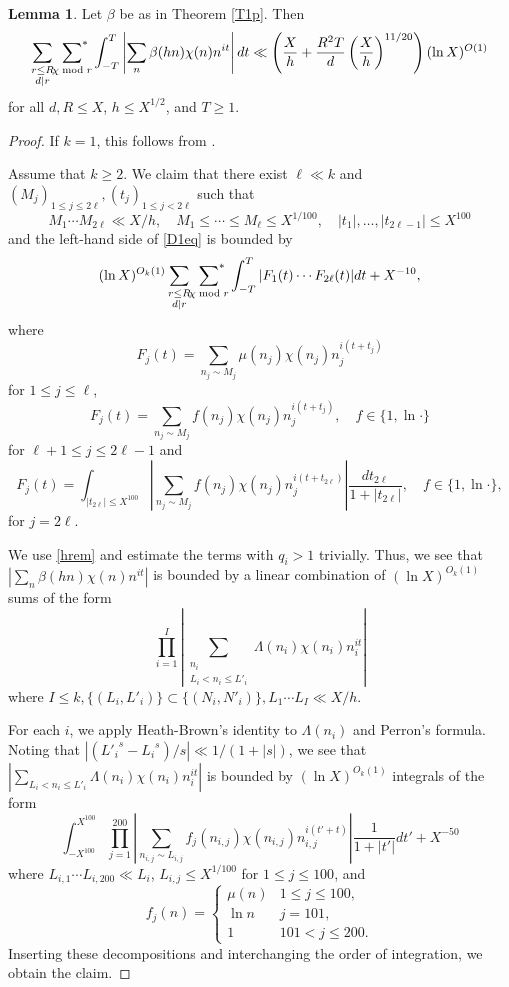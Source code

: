 \documentclass{amsart}
\theoremstyle{definition}
\newtheorem{lem}[dfn]{Lemma}
\theoremstyle{remark}
\newcommand{\1}{
    \bm{1}
}
\begin{document}
\begin{lem}\label{D1}
Let $\beta$ be as in Theorem \ref{T1p}. Then
\begin{equation} \label{D1eq} \sum_{\substack{r \leq R \\ d|r}} \sideset{}{^*}\sum_{\chi \bmod r} \int_{-T}^{T} \left| \sum_{n} \beta(hn) \chi(n) n^{it} \right| dt \ll \left(\frac{X}{h} + \frac{R^2T}{d}\left( \frac{X}{h} \right)^{11/20}\right) (\ln{X})^{O(1)} \end{equation}
for all $d,R \leq X$, $h \leq X^{1/2}$, and $T \geq 1$. 
\end{lem}

\begin{proof}
If $k=1$, this follows from \cite[Theorem 1.1]{choi2006mean}. 

Assume that $k \geq 2$. We claim that there exist $\ell \ll k$ and $(M_j)_{1 \leq j \leq 2\ell}, (t_j)_{1 \leq j < 2\ell}$ such that
\[ M_1 \cdots M_{2\ell} \ll X/h, \quad M_1 \leq \cdots \leq M_{\ell} \leq X^{1/100}, \quad |t_1|,\ldots,|t_{2\ell-1}| \leq X^{100} \]
and the left-hand side of \eqref{D1eq} is bounded by
\begin{equation} \label{D1F} (\ln{X})^{O_k(1)} \sum_{\substack{r \leq R \\ d|r}} \sideset{}{^*}\sum_{\chi \bmod r} \int_{-T}^{T} |F_1(t) \cdots F_{2\ell}(t)| dt + X^{-10}, \end{equation}
where
\[ F_j(t) = \sum_{n_j \sim M_j} \mu(n_j) \chi(n_j) n_j^{i(t+t_j)} \]
for $1 \leq j \leq \ell$, 
\[ F_j(t) = \sum_{n_j \sim M_j} f(n_j) \chi(n_j) n_j^{i(t+t_j)}, \quad f \in \{1,\ln{\cdot}\} \]
for $\ell+1 \leq j \leq 2\ell-1$ and
\[ F_j(t) = \int_{|t_{2\ell}| \leq X^{100}} \left| \sum_{n_j \sim M_j} f(n_{j}) \chi(n_j) n_j^{i(t+t_{2\ell})} \right| \frac{dt_{2\ell}}{1+|t_{2\ell}|}, \quad f \in \{1,\ln{\cdot}\}, \]
for $j=2\ell$. 


We use \eqref{hrem} and estimate the terms with \(q_i>1\) trivially. Thus, we see that $\left| \sum_{n} \beta(hn) \chi(n) n^{it} \right|$ is bounded by a linear combination of $(\ln{X})^{O_k(1)}$ sums of the form
\[ \prod_{i=1}^{I} \left| \sum_{\substack{n_i \\ L_i < n_i \leq L'_i}} \Lambda(n_i) \chi(n_i) n^{it}_i \right| \]
where $I \leq k, \{(L_i,L'_i)\} \subset \{(N_i,N'_i)\}, L_1 \cdots L_I \ll X/h$. 


For each $i$, we apply Heath-Brown's identity to $\Lambda(n_i)$ and Perron's formula. 
Noting that $\left| ({L'_i}^{s}-{L_i}^{s})/s \right| \ll 1/(1+|s|)$, we see that $\left| \sum_{L_i < n_i \leq L'_i} \Lambda(n_i) \chi(n_i) n^{it}_i \right|$ is bounded by $(\ln{X})^{O_k(1)}$ integrals of the form 
\[ \int_{-X^{100}}^{X^{100}} \prod_{j=1}^{200} \left| \sum_{n_{i,j} \sim L_{i,j}} f_j(n_{i,j}) \chi(n_{i,j}) n_{i,j}^{i(t'+t)} \right| \frac{1}{1+|t'|} dt' + X^{-50} \]
where $L_{i,1} \cdots L_{i,200} \ll L_i$, $L_{i,j} \leq X^{1/100}$ for $1 \leq j \leq 100$, and 
\[ f_j(n) =
\begin{cases}
\mu(n) & 1 \leq j \leq 100, \\
\ln{n} & j=101, \\
1 & 101 < j \leq 200.
\end{cases}
\]
Inserting these decompositions and interchanging the order of integration, we obtain the claim. 



\end{proof}
\end{document}
